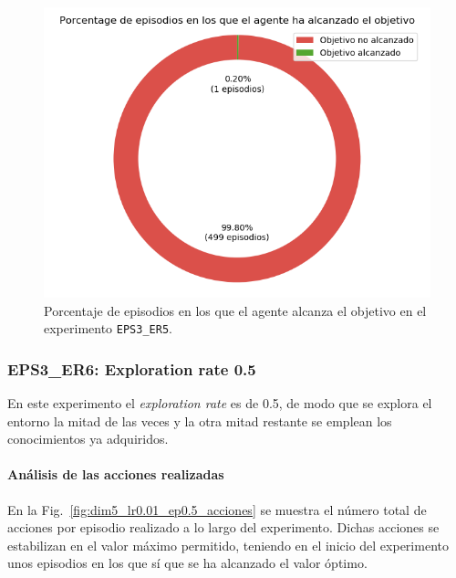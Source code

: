 \begin{figure}
    \centering
    \includegraphics[scale=0.4]{cap5_experimentacion/images/dim5_lr0.01_ep0.4_porcentajeResuelto.png}
    \caption{Porcentaje de episodios en los que el agente alcanza el objetivo en el experimento \texttt{EPS3\_ER5}.}
    \label{fig:dim5_lr0.01_ep0.4_porcentajeResuelto}
\end{figure}

\subsubsection{EPS3\_ER6: Exploration rate 0.5} \label{EPS3_ER6}

En este experimento el \textit{exploration rate} es de 0.5, de modo que se explora el entorno la mitad de las veces y la otra mitad restante se emplean los conocimientos ya adquiridos. \\

\paragraph{Análisis de las acciones realizadas}

En la Fig.~\ref{fig:dim5_lr0.01_ep0.5_acciones} se muestra el número total de acciones por episodio realizado a lo largo del experimento. Dichas acciones se estabilizan en el valor máximo permitido, teniendo en el inicio del experimento unos episodios en los que sí que se ha alcanzado el valor óptimo. \\

